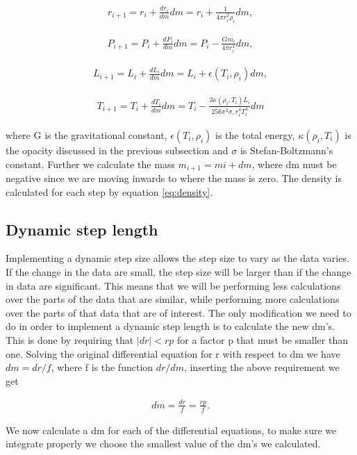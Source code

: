 \documentclass[a4paper,10pt]{article}
\begin{document}
\begin{align}
r_{i+1} = r_i + \frac{dr_i}{dm}dm = r_i + \frac{1}{4\pi r_i^2 \rho_i}dm,
\end{align}

\begin{align}
P_{i+1} = P_i + \frac{dP_i}{dm}dm = P_i - \frac{Gm_i}{4\pi r_i^4}dm,
\end{align}

\begin{align}
L_{i+1} = L_i + \frac{dL_i}{dm}dm = L_i + \epsilon(T_i,\rho_i)dm,
\end{align}

\begin{align}
T_{i+1} = T_i + \frac{dT_i}{dm}dm = T_i - \frac{3\kappa(\rho_i,T_i)L_i}{256\pi^2 \sigma, r_i^4 T_i^4}dm
\end{align}

where G is the gravitational constant, $\epsilon(T_i,\rho_i)$ is the total energy, $\kappa(\rho_i,T_i)$ is the opacity discussed in the previous subsection and $\sigma$ is Stefan-Boltzmann's constant. Further we calculate the mass $m_{i+1} = m{i} + dm$, where dm must be negative since we are moving inwards to where the mass is zero. The density is calculated for each step by equation \eqref{eq:density}.


\subsection{Dynamic step length}
Implementing a dynamic step size allows the step size to vary as the data varies. If the change in the data are small, the step size will be larger than if the change in data are significant. This means that we will be performing less calculations over the parts of the data that are similar, while performing more calculations over the parts of that data that are of interest. The only modification we need to do in order to implement a dynamic step length is to calculate the new dm's. This is done by requiring that $|dr| < rp$ for a factor p that must be smaller than one. Solving the original differential equation for r with respect to dm we have $dm = dr/f$, where f is the function $dr/dm$, inserting the above requirement we get

\begin{align}
dm = \frac{dr}{f} = \frac{rp}{f}.
\end{align}

We now calculate a dm for each of the differential equations, to make sure we integrate properly we choose the smallest value of the dm's we calculated.
\end{document}
